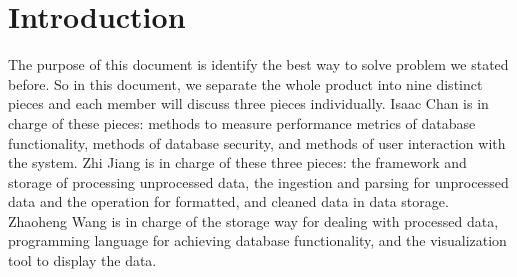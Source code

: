 \section{Introduction}
The purpose of this document is identify the best way to solve problem we stated before. So in this document, we separate the whole product into nine distinct pieces and each member will discuss three pieces individually. Isaac Chan is in charge of these pieces: methods to measure performance metrics of database functionality, methods of database security, and methods of user interaction with the system. Zhi Jiang is in charge of these three pieces: the framework and storage of processing unprocessed data, the ingestion and parsing for unprocessed data and the operation for formatted, and cleaned data in data storage. Zhaoheng Wang is in charge of the storage way for dealing with processed data, programming language for achieving database functionality, and the visualization tool to display the data. 